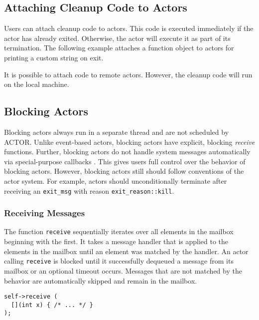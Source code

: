 
\subsection{Attaching Cleanup Code to Actors}
\label{attach}

Users can attach cleanup code to actors. This code is executed immediately if
the actor has already exited. Otherwise, the actor will execute it as part of
its termination. The following example attaches a function object to actors for
printing a custom string on exit.


It is possible to attach code to remote actors. However, the cleanup code will
run on the local machine.

\subsection{Blocking Actors}
\label{blocking-actor}

Blocking actors always run in a separate thread and are not scheduled by ACTOR.
Unlike event-based actors, blocking actors have explicit, blocking
\emph{receive} functions. Further, blocking actors do not handle system
messages automatically via special-purpose callbacks .
This gives users full control over the behavior of blocking actors. However,
blocking actors still should follow conventions of the actor system. For
example, actors should unconditionally terminate after receiving an
\lstinline^exit_msg^ with reason \lstinline^exit_reason::kill^.

\subsubsection{Receiving Messages}

The function \lstinline^receive^ sequentially iterates over all elements in the
mailbox beginning with the first. It takes a message handler that is applied to
the elements in the mailbox until an element was matched by the handler. An
actor calling \lstinline^receive^ is blocked until it successfully dequeued a
message from its mailbox or an optional timeout occurs. Messages that are not
matched by the behavior are automatically skipped and remain in the mailbox.

\begin{lstlisting}
self->receive (
  [](int x) { /* ... */ }
);
\end{lstlisting}

